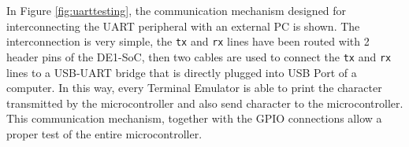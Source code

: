 In Figure \ref{fig:uarttesting}, the communication mechanism designed for interconnecting the UART peripheral with an external PC is shown. The interconnection is very simple, the \texttt{tx} and \texttt{rx} lines have been routed with 2 header pins of the DE1-SoC, then two cables are used to connect the \texttt{tx} and \texttt{rx} lines to a USB-UART bridge that is directly plugged into USB Port of a computer. In this way, every Terminal Emulator is able to print the character transmitted by the microcontroller and also send character to the microcontroller. This communication mechanism, together with the GPIO connections allow a proper test of the entire microcontroller.